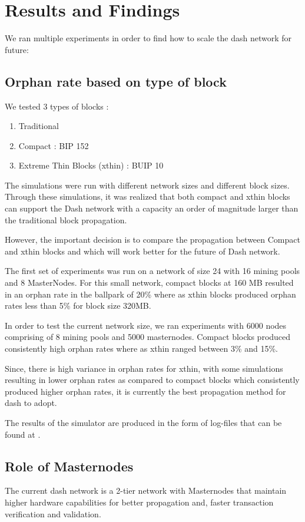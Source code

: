 \documentclass{article}
\begin{document}
\section{Results and Findings}

We ran multiple experiments in order to find how to scale the dash network for future:

\subsection{Orphan rate based on type of block}
We tested 3 types of blocks :

\begin{enumerate}
    \item Traditional
    \item Compact : BIP 152
    \item Extreme Thin Blocks (xthin) : BUIP 10
\end{enumerate}

The simulations were run with different network sizes and different block sizes.
Through these simulations, it was realized that both compact and xthin blocks can support the Dash network with a
capacity an order of magnitude larger than the traditional block propagation.

However, the important decision is to compare the propagation between Compact and xthin blocks and which will work
better for the future of Dash network.

The first set of experiments was run on a network of size 24 with 16 mining pools and 8 MasterNodes.
For this small network, compact blocks at 160 MB resulted in an orphan rate in the ballpark of 20\% where as xthin
blocks produced orphan rates less than 5\% for block size 320MB. 

In order to test the current network size, we ran experiments with 6000 nodes comprising of 8 mining pools and 5000
masternodes. Compact blocks produced consistently high orphan rates where as xthin ranged between 3\% and 15\%. 

Since, there is high variance in orphan rates for xthin, with some simulations resulting in lower orphan rates as
compared to compact blocks which consistently produced higher orphan rates, it is currently the best propagation method for dash to adopt.

The results of the simulator are produced in the form of log-files that can be found at \cite{results}.

\subsection{Role of Masternodes}
The current dash network is a 2-tier network with Masternodes that maintain higher hardware capabilities for better
propagation and, faster transaction verification and validation.
\end{document}
